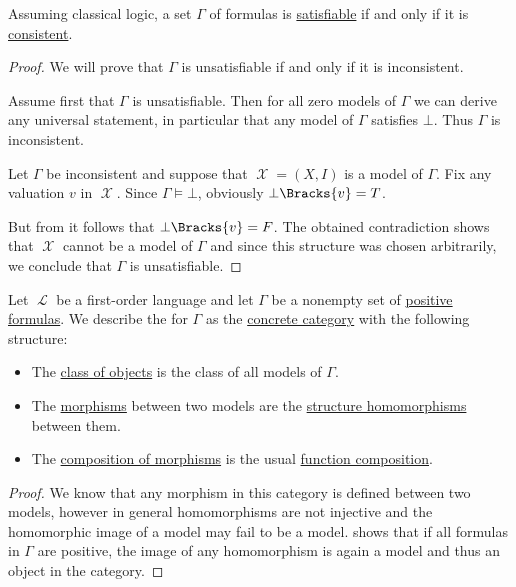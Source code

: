 \begin{proposition}\label{thm:formulas_satisfiable_iff_consistent}
  Assuming classical logic, a set \( \Gamma \) of formulas is \hyperref[def:propositional_semantics/satisfiability]{satisfiable} if and only if it is \hyperref[def:first_order_theory/consistent]{consistent}.
\end{proposition}
\begin{proof}
  We will prove that \( \Gamma \) is unsatisfiable if and only if it is inconsistent.

  \SufficiencySubProof Assume first that \( \Gamma \) is unsatisfiable. Then for all zero models of \( \Gamma \) we can derive any universal statement, in particular that any model of \( \Gamma \) satisfies \( \bot \). Thus \( \Gamma \) is inconsistent.

  \NecessitySubProof Let \( \Gamma \) be inconsistent and suppose that \( \mscrX = (X, I) \) is a model of \( \Gamma \). Fix any valuation \( v \) in \( \mscrX \). Since \( \Gamma \vDash \bot \), obviously \( \bot\Bracks{v} = T \).

  But from  it follows that \( \bot\Bracks{v} = F \). The obtained contradiction shows that \( \mscrX \) cannot be a model of \( \Gamma \) and since this structure was chosen arbitrarily, we conclude that \( \Gamma \) is unsatisfiable.
\end{proof}

\begin{definition}\label{def:category_of_first_order_models}
  Let \( \mscrL \) be a first-order language and let \( \Gamma \) be a nonempty set of \hyperref[def:positive_formula]{positive formulas}. We describe the  for \( \Gamma \) as the \hyperref[def:concrete_category]{concrete category} with the following structure:
  \begin{itemize}
    \item The \hyperref[def:category/C1]{class of objects} is the class of all models of \( \Gamma \).

    \item The \hyperref[def:category/C2]{morphisms} between two models are the \hyperref[def:first_order_homomorphism]{structure homomorphisms} between them.

    \item The \hyperref[def:category/C3]{composition of morphisms} is the usual \hyperref[def:multi_valued_function/composition]{function composition}.
  \end{itemize}
\end{definition}
\begin{proof}
  We know that any morphism in this category is defined between two models, however in general homomorphisms are not injective and the homomorphic image of a model may fail to be a model.  shows that if all formulas in \( \Gamma \) are positive, the image of any homomorphism is again a model and thus an object in the category.
\end{proof}

